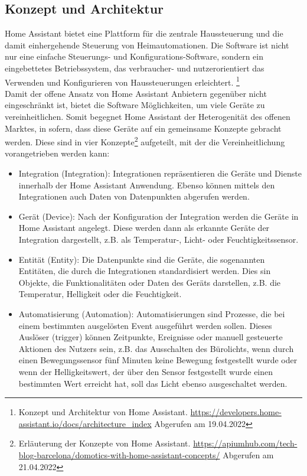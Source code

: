 \subsection{Konzept und Architektur}
\label{sec:conceptArchitectureHAOS}
    Home Assistant bietet eine Plattform für die zentrale Haussteuerung und die damit einhergehende Steuerung von Heimautomationen. Die 
    Software ist nicht nur eine einfache Steuerungs- und Konfigurations-Software, sondern ein eingebettetes Betriebssystem, das 
    verbraucher- und nutzerorientiert das Verwenden und Konfigurieren von Haussteuerungen erleichtert. \footnote{Konzept und Architektur von Home Assistant. \url{https://developers.home-assistant.io/docs/architecture_index} Abgerufen am 19.04.2022}
    \\
    \linebreak
    Damit der offene Ansatz von Home Assistant Anbietern gegenüber nicht eingeschränkt ist, bietet die Software Möglichkeiten, um viele 
    Geräte zu vereinheitlichen. Somit begegnet Home Assistant der Heterogenität des offenen Marktes, in sofern, dass diese Geräte auf ein 
    gemeinsame Konzepte gebracht werden. Diese sind in vier Konzepte\footnote{Erläuterung der Konzepte von Home Assistant. \url{https://apiumhub.com/tech-blog-barcelona/domotics-with-home-assistant-concepts/} Abgerufen am 21.04.2022} 
    aufgeteilt, mit der die Vereinheitlichung vorangetrieben werden kann: 
    \begin{itemize}
        \item Integration (Integration): Integrationen repräsentieren die Geräte und Dienste innerhalb der Home Assistant Anwendung. 
              Ebenso können mittels den Integrationen auch Daten von Datenpunkten abgerufen werden.
        \item Gerät (Device): Nach der Konfiguration der Integration werden die Geräte in Home Assistant angelegt. 
              Diese werden dann als erkannte Geräte der Integration dargestellt, z.B. als Temperatur-, Licht- oder Feuchtigkeitssensor.
        \item Entität (Entity): Die Datenpunkte sind die Geräte, die sogenannten Entitäten, die durch die Integrationen standardisiert werden. 
              Dies sin Objekte, die Funktionalitäten oder Daten des Geräts darstellen, z.B. die Temperatur, Helligkeit oder die Feuchtigkeit.
        \item Automatisierung (Automation): Automatisierungen sind Prozesse, die bei einem bestimmten ausgelösten Event ausgeführt werden 
              sollen. Dieses Auslöser (trigger) können Zeitpunkte, Ereignisse oder manuell gesteuerte Aktionen des Nutzers sein, z.B. das 
              Ausschalten des Bürolichts, wenn durch einen Bewegungssensor fünf Minuten keine Bewegung festgestellt wurde oder wenn der 
              Helligkeitswert, der über den Sensor festgestellt wurde einen bestimmten Wert erreicht hat, soll das Licht ebenso 
              ausgeschaltet werden.
    \end{itemize}
